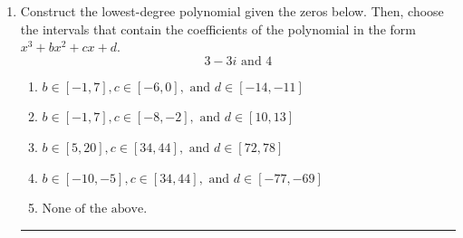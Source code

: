 \documentclass[14pt]{extbook}
\newcommand{\litem}[1]{\item#1\hspace*{-1cm}\rule{\textwidth}{0.4pt}}
\begin{document}
\begin{enumerate}
{\begin{enumerate}[label=\Alph*.]
\end{enumerate} }
\litem{
Construct the lowest-degree polynomial given the zeros below. Then, choose the intervals that contain the coefficients of the polynomial in the form $x^3+bx^2+cx+d$.\[ 3 - 3 i \text{ and } 4 \]\begin{enumerate}[label=\Alph*.]
\item \( b \in [-1, 7], c \in [-6, 0], \text{ and } d \in [-14, -11] \)
\item \( b \in [-1, 7], c \in [-8, -2], \text{ and } d \in [10, 13] \)
\item \( b \in [5, 20], c \in [34, 44], \text{ and } d \in [72, 78] \)
\item \( b \in [-10, -5], c \in [34, 44], \text{ and } d \in [-77, -69] \)
\item \( \text{None of the above.} \)

\end{enumerate} }
\end{enumerate}
\end{document}
